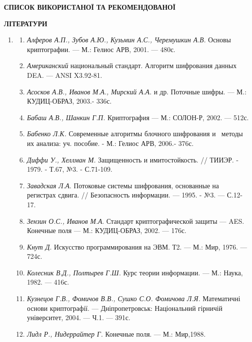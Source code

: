 \bigskip


\bigskip

{\centering\bfseries
СПИСОК  ВИКОРИСТАНОЇ  ТА  РЕКОМЕНДОВАНОЇ
\par}

{\centering\bfseries
ЛІТЕРАТУРИ
\par}


\bigskip


\bigskip

\liststyleWWviiiNumli
\begin{enumerate}
\item \begin{enumerate}
\item \textit{Алфе}\textit{ров А.П., Зубов А.Ю., Кузьмин А.С., Черемушкин А.В.
}Основы криптографии. --- М.: Гелиос АРВ,  2001. --- 480с.
\item \textit{Американский} национальный стандарт. Алгоритм шифрования данных 
DEA. --- ANSI X3.92-81. 
\item \textit{Асосков А.В., Иванов М.А., Мирский А.А.} и др. Поточные шифры. ---
М.: КУДИЦ-ОБРАЗ, 2003.- 336с.
\item \textit{Бабаш А.В., Шанкин Г.П.} Криптография --- М.: СОЛОН-Р, 2002. --- 512с.
\item {\color[rgb]{0.2,0.2,0.2}
 \textit{Бабенко Л.К.} Современные алгоритмы блочного шифрования и~ методы их
анализа: уч. пособие. - М.: Гелиос АРВ, 2006.- 376с.}
\item {\color[rgb]{0.2,0.2,0.2}
 \textit{Диффи У., Хеллман М.} Защищенность и имитостойкость. // ТИИЭР. - 1979.
- Т.67, №3. - С.71-109.}
\item \textit{Завадская Л.А}. Потоковые системы шифрования, основанные на
регистрах сдвига. // Безопасность информации. --- 1995. - №3. --- С.12-17.
\item \textit{Зензин О.С., Иванов М.А}. Стандарт криптографической защиты --- AES.
 Конечные поля --- М.: КУДИЦ-ОБРАЗ, 2002. ---  176с.
\item \textit{Кнут Д.} Искусство программирования на ЭВМ. Т2. --- М.: Мир, 1976. ---
724с.
\item \textit{Колесник В.Д., Полтырев Г.Ш.} Курс теории информации. --- М.: Наука,
1982. --- 416с. 
\item \textit{Кузнецов Г.В., Фомич}\textit{о}\textit{в В.В., Сушко С.О. Фомичова
Л.Я. }Математичні основи криптографії. --- Дніпропетровськ: Національний гірничій
університет, 2004. --- Ч.1. --- 391с.
\item \textit{ }\textit{Лидл Р., Нидеррайтер Г.} Конечные поля. --- М.: Мир,1988.

\end{enumerate}
\end{enumerate}
